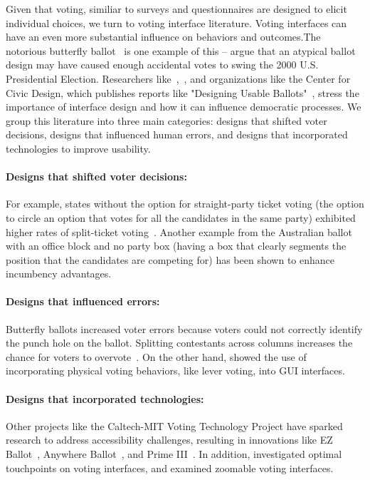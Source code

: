 Given that voting, similiar to surveys and questionnaires are designed to elicit individual choices, we turn to voting interface literature. Voting interfaces can have an even more substantial influence on behaviors and outcomes.The notorious butterfly ballot~\cite{wandButterflyDidIt2001} is one example of this -- \textcite{wandButterflyDidIt2001} argue that an atypical ballot design may have caused enough accidental votes to swing the 2000 U.S. Presidential Election. Researchers like~\textcite{engstrom2020politics},~\textcite{chisnellDemocracyDesignProblem2016}, and organizations like the Center for Civic Design, which publishes reports like "Designing Usable Ballots"~\cite{DesigningUsableBallots2015}, stress the importance of interface design and how it can influence democratic processes. We group this literature into three main categories: designs that shifted voter decisions, designs that influenced human errors, and designs that incorporated technologies to improve usability.

\paragraph{Designs that shifted voter decisions: } For example, states without the option for straight-party ticket voting (the option to circle an option that votes for all the candidates in the same party) exhibited higher rates of split-ticket voting~\cite{engstrom2020politics}. Another example from the Australian ballot with an office block and no party box (having a box that clearly segments the position that the candidates are competing for) has been shown to enhance incumbency advantages.
\paragraph{Designs that influenced errors: } Butterfly ballots increased voter errors because voters could not correctly identify the punch hole on the ballot. Splitting contestants across columns increases the chance for voters to overvote~\cite{quesenberyOpinionGoodDesign2020}. On the other hand, \textcite{everettElectronicVotingMachines2008} showed the use of incorporating physical voting behaviors, like lever voting, into GUI interfaces.
\paragraph{Designs that incorporated technologies: } Other projects like the Caltech-MIT Voting Technology Project have sparked research to address accessibility challenges, resulting in innovations like EZ Ballot~\cite{leeUniversalDesignBallot2016}, Anywhere Ballot~\cite{summers2014making}, and Prime III~\cite{dawkinsPrimeIIIInnovative2009}. In addition, \textcite{gilbertAnomalyDetectionElectronic2013} investigated optimal touchpoints on voting interfaces, and \textcite{conradElectronicVotingEliminates2009} examined zoomable voting interfaces.

